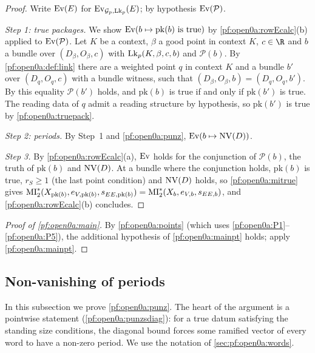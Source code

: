 \begin{proof}
Write $\mathrm{Ev}(E)$ for $\mathrm{Ev}_{\mathcal G_p,\mathrm{Lk}_p}(E)$; by hypothesis $\mathrm{Ev}(\mathcal P)$.

\emph{Step 1: true packages.} We show $\mathrm{Ev}(b\mapsto\mathrm{pk}(b)\text{ is true})$ by
\cref{pf:open0a:rowEcalc}(b) applied to $\mathrm{Ev}(\mathcal P)$. Let $K$ be a context, $\beta$ a good point in
context $K$, $c\in\R$ and $b$ a bundle over $(D_\beta,O_\beta,c)$ with $\mathrm{Lk}_p(K,\beta,c,b)$ and
$\mathcal P(b)$. By \cref{pf:open0a:def:link} there are a weighted point $q$ in context $K$ and a bundle $b'$ over
$(D_q,O_q,c)$ with a bundle witness, such that $(D_\beta,O_\beta,b)=(D_q,O_q,b')$. By this equality $\mathcal P(b')$
holds, and $\mathrm{pk}(b)$ is true if and only if $\mathrm{pk}(b')$ is true. The reading data of $q$ admit a reading
structure by hypothesis, so $\mathrm{pk}(b')$ is true by \cref{pf:open0a:truepack}.

\emph{Step 2: periods.} By Step~1 and \cref{pf:open0a:punz}, $\mathrm{Ev}(b\mapsto\mathrm{NV}(D))$.

\emph{Step 3.} By \cref{pf:open0a:rowEcalc}(a), $\mathrm{Ev}$ holds for the conjunction of $\mathcal P(b)$, the
truth of $\mathrm{pk}(b)$ and $\mathrm{NV}(D)$. At a bundle where the conjunction holds, $\mathrm{pk}(b)$ is true,
$r_S\ge1$ (the last point condition) and $\mathrm{NV}(D)$ holds, so \cref{pf:open0a:mitrue} gives
$\mathrm{MI}^{*}_{2}(X_{\mathrm{pk}(b)},e_{V,\mathrm{pk}(b)},s_{EE,\mathrm{pk}(b)})=\mathrm{MI}^{*}_{2}(X_b,e_{V,b},s_{EE,b})$, and
\cref{pf:open0a:rowEcalc}(b) concludes.
\end{proof}

\begin{proof}[Proof of \cref{pf:open0a:main}]
By \cref{pf:open0a:points} (which uses \ref{pf:open0a:P1}--\ref{pf:open0a:P5}), the additional hypothesis of
\cref{pf:open0a:mainpt} holds; apply \cref{pf:open0a:mainpt}.
\end{proof}


\subsection{Non-vanishing of periods}\label{sec:pf:open0a:punz}

In this subsection we prove \cref{pf:open0a:punz}. The heart of the argument is a pointwise statement
(\cref{pf:open0a:punzsdiag}): for a true datum satisfying the standing size conditions, the diagonal bound forces some
ramified vector of every word to have a non-zero period. We use the notation of \cref{sec:pf:open0a:words}.


